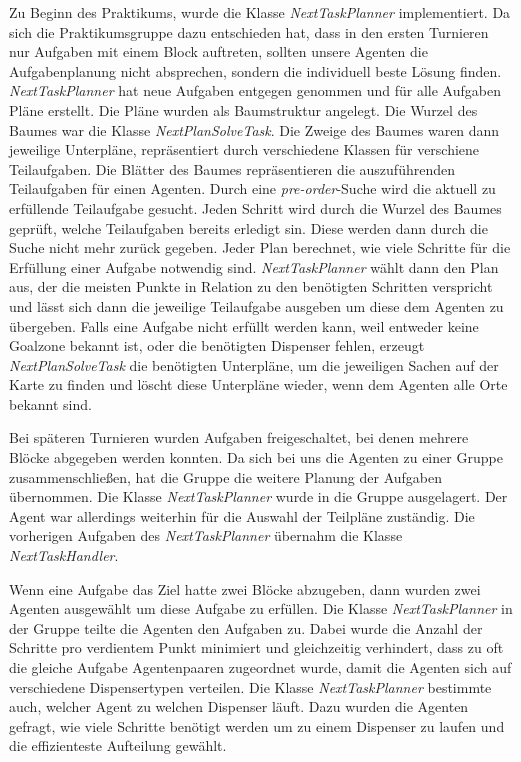 Zu Beginn des Praktikums, wurde die Klasse \textit{NextTaskPlanner} implementiert. Da sich die Praktikumsgruppe dazu entschieden hat, dass in den ersten Turnieren nur Aufgaben mit einem Block auftreten, sollten unsere Agenten die Aufgabenplanung nicht absprechen, sondern die individuell beste Lösung finden. \textit{NextTaskPlanner} hat neue Aufgaben entgegen genommen und für alle Aufgaben Pläne erstellt.
Die Pläne wurden als Baumstruktur angelegt. Die Wurzel des Baumes war die Klasse \textit{NextPlanSolveTask}. Die Zweige des Baumes waren dann jeweilige Unterpläne, repräsentiert durch verschiedene Klassen für verschiene Teilaufgaben. Die Blätter des Baumes repräsentieren die auszuführenden Teilaufgaben für einen Agenten. Durch eine \textit{pre-order}-Suche wird die aktuell zu erfüllende Teilaufgabe gesucht. Jeden Schritt wird durch die Wurzel des Baumes geprüft, welche Teilaufgaben bereits erledigt sin. Diese werden dann durch die Suche nicht mehr zurück gegeben.
Jeder Plan berechnet, wie viele Schritte für die Erfüllung einer Aufgabe notwendig sind. \textit{NextTaskPlanner} wählt dann den Plan aus, der die meisten Punkte in Relation zu den benötigten Schritten verspricht und lässt sich dann die jeweilige Teilaufgabe ausgeben um diese dem Agenten zu übergeben.
Falls eine Aufgabe nicht erfüllt werden kann, weil entweder keine Goalzone bekannt ist, oder die benötigten Dispenser fehlen, erzeugt \textit{NextPlanSolveTask} die benötigten Unterpläne, um die jeweiligen Sachen auf der Karte zu finden und löscht diese Unterpläne wieder, wenn dem Agenten alle Orte bekannt sind.

Bei späteren Turnieren wurden Aufgaben freigeschaltet, bei denen mehrere Blöcke abgegeben werden konnten. Da sich bei uns die Agenten zu einer Gruppe zusammenschließen, hat die Gruppe die weitere Planung der Aufgaben übernommen. Die Klasse \textit{NextTaskPlanner} wurde in die Gruppe ausgelagert. Der Agent war allerdings weiterhin für die Auswahl der Teilpläne zuständig. Die vorherigen Aufgaben des \textit{NextTaskPlanner} übernahm die Klasse \textit{NextTaskHandler}. 

Wenn eine Aufgabe das Ziel hatte zwei Blöcke abzugeben, dann wurden zwei Agenten ausgewählt um diese Aufgabe zu erfüllen. Die Klasse \textit{NextTaskPlanner} in der Gruppe teilte die Agenten den Aufgaben zu. Dabei wurde die Anzahl der Schritte pro verdientem Punkt minimiert und gleichzeitig verhindert, dass zu oft die gleiche Aufgabe Agentenpaaren zugeordnet wurde, damit die Agenten sich auf verschiedene Dispensertypen verteilen. Die Klasse \textit{NextTaskPlanner} bestimmte auch, welcher Agent zu welchen Dispenser läuft. Dazu wurden die Agenten gefragt, wie viele Schritte benötigt werden um zu einem Dispenser zu laufen und die  effizienteste Aufteilung gewählt.

